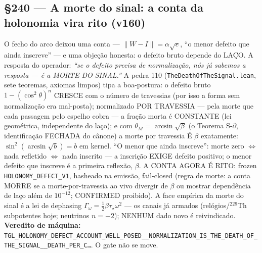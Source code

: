\documentclass[11pt]{article}
\theoremstyle{definition}\newtheorem{deriv}{Derivação}
\begin{document}
\subsection*{\S240 --- A morte do sinal: a conta da holonomia vira rito (v160)}O fecho do arco deixou uma conta --- $\|W{-}I\| = \alpha\sqrt{e}$, ``o menor defeito que ainda inscreve'' --- e uma objeção honesta: o defeito bruto depende do LAÇO. A resposta do operador: \emph{``se o defeito precisa de normalização, nós já sabemos a resposta --- é a MORTE DO SINAL.''} A pedra 110 (\texttt{TheDeathOfTheSignal.lean}, sete teoremas, axiomas limpos) tipa a boa-postura: o defeito bruto $1{-}(\cos^2\theta)^n$ CRESCE com o número de travessias (por isso a forma sem normalização era mal-posta); normalizado POR TRAVESSIA --- pela morte que cada passagem pelo espelho cobra --- a fração morta é CONSTANTE (lei geométrica, independente do laço); e com $\theta_M{=}\arcsin\sqrt{\beta}$ (o Teorema S-$\partial$, identificação FECHADA do cânone) a morte por travessia É $\beta$ exatamente: $\sin^2(\arcsin\sqrt{b}){=}b$ em kernel. ``O menor que ainda inscreve'': morte zero $\Leftrightarrow$ nada refletido $\Leftrightarrow$ nada inscrito --- a inscrição EXIGE defeito positivo; o menor defeito que inscreve é a primeira reflexão, $\beta$. A CONTA AGORA É RITO: frozen \texttt{HOLONOMY\_DEFECT\_V1}, hasheado na emissão, fail-closed (regra de morte: a conta MORRE se a morte-por-travessia ao vivo divergir de $\beta$ ou mostrar dependência de laço além de $10^{-12}$; CONFIRMED proibido). A face empírica da morte do sinal é a lei de dephasing $\Gamma_\omega{=}\tfrac12\beta\tau_\star\omega^2$ --- os canais já armados (relógios/$^{229}$Th subpotentes hoje; neutrinos $n{=}{-}2$); NENHUM dado novo é reivindicado. \textbf{Veredito de máquina:} \texttt{TGL\_HOLONOMY\_DEFECT\_ACCOUNT\_WELL\_POSED\_\_NORMALIZATION\_IS\_THE\_DEATH\_OF\_THE\_SIGNAL\_\_DEATH\_PER\_C\ldots}. O gate não se move.
\end{document}
